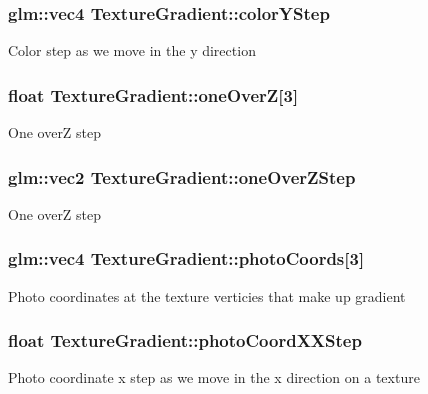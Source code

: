 \subsubsection[{color\+Y\+Step}]{\setlength{\rightskip}{0pt plus 5cm}glm\+::vec4 Texture\+Gradient\+::color\+Y\+Step}\label{class_texture_gradient_ac34b317ff76b5493b159b3491df26839}
Color step as we move in the y direction \hypertarget{class_texture_gradient_af7d99a3ca4515f65a8afeb5139cd2d8e}{}
\subsubsection[{one\+Over\+Z}]{\setlength{\rightskip}{0pt plus 5cm}float Texture\+Gradient\+::one\+Over\+Z\mbox{[}3\mbox{]}}\label{class_texture_gradient_af7d99a3ca4515f65a8afeb5139cd2d8e}
One over\+Z step \hypertarget{class_texture_gradient_a504ba2546491bbe0eb80c9e496020aff}{}
\subsubsection[{one\+Over\+Z\+Step}]{\setlength{\rightskip}{0pt plus 5cm}glm\+::vec2 Texture\+Gradient\+::one\+Over\+Z\+Step}\label{class_texture_gradient_a504ba2546491bbe0eb80c9e496020aff}
One over\+Z step \hypertarget{class_texture_gradient_a864076b3aeea93295c0f3d262ede9fac}{}
\subsubsection[{photo\+Coords}]{\setlength{\rightskip}{0pt plus 5cm}glm\+::vec4 Texture\+Gradient\+::photo\+Coords\mbox{[}3\mbox{]}}\label{class_texture_gradient_a864076b3aeea93295c0f3d262ede9fac}
Photo coordinates at the texture verticies that make up gradient \hypertarget{class_texture_gradient_a34bee5b4f0894efeec794704d3fd2cec}{}
\subsubsection[{photo\+Coord\+X\+X\+Step}]{\setlength{\rightskip}{0pt plus 5cm}float Texture\+Gradient\+::photo\+Coord\+X\+X\+Step}\label{class_texture_gradient_a34bee5b4f0894efeec794704d3fd2cec}
Photo coordinate x step as we move in the x direction on a texture \hypertarget{class_texture_gradient_ad667fab8a0c76c19fdb5d27510b5a9ba}{}
